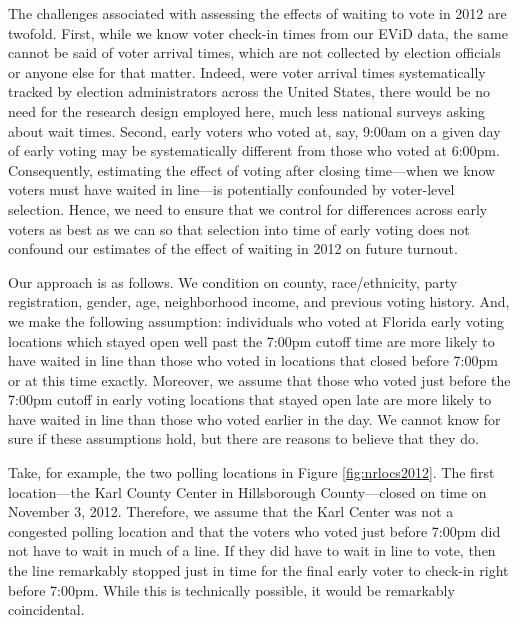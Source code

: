 \documentclass[12pt,titlepage]{article}
\begin{document}
The challenges associated with assessing the effects of waiting to
vote in 2012 are twofold.  First, while we know voter check-in times
from our EViD data, the same cannot be said of voter arrival times,
which are not collected by election officials or anyone else for that
matter.  Indeed, were voter arrival times systematically tracked by
election administrators across the United States, there would be no
need for the research design employed here, much less national surveys
asking about wait times.  Second, early voters who voted at, say,
9:00am on a given day of early voting may be systematically different
from those who voted at 6:00pm. Consequently, estimating the effect of
voting after closing time---when we know voters must have waited in
line---is potentially confounded by voter-level selection.  Hence, we
need to ensure that we control for differences across early voters as
best as we can so that selection into time of early voting does not
confound our estimates of the effect of waiting in 2012 on future
turnout.


Our approach is as follows.  We condition on county, race/ethnicity,
party registration, gender, age, neighborhood income, and previous
voting history.  And, we make the following assumption: individuals
who voted at Florida early voting locations which stayed open well
past the 7:00pm cutoff time are more likely to have waited in line
than those who voted in locations that closed before 7:00pm or at this
time exactly.  Moreover, we assume that those who voted just before
the 7:00pm cutoff in early voting locations that stayed open late are
more likely to have waited in line than those who voted earlier in the
day.  We cannot know for sure if these assumptions hold, but there are
reasons to believe that they do.

Take, for example, the two polling locations in Figure
\ref{fig:nrlocs2012}.  The first location---the Karl County Center in
Hillsborough County---closed on time on November 3, 2012.  Therefore,
we assume that the Karl Center was not a congested polling location
and that the voters who voted just before 7:00pm did not have to wait
in much of a line.  If they did have to wait in line to vote, then the
line remarkably stopped just in time for the final early voter to
check-in right before 7:00pm.  While this is technically possible, it
would be remarkably coincidental.
\end{document}
